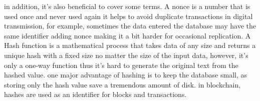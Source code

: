 in addition, it's also beneficial to cover some terms. 
A nonce is a number that is used once and never used again it helps to avoid duplicate transactions in digital transmission, for example, sometimes the data entered the database may have the same identifier adding nonce making it a bit harder for occasional replication. 
A Hash function is a mathematical process that takes data of any size and returns a unique hash with a fixed size no matter the size of the input data, however, it's only a one-way function thus it's hard to generate the original text from the hashed value. one major advantage of hashing is to keep the database small, as storing only the hash value save a tremendous amount of disk. in blockchain, hashes are used as an identifier for blocks and transactions. \\ 

